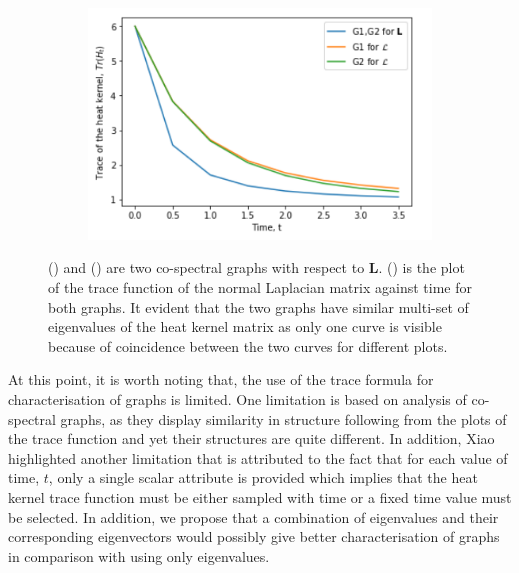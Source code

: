 \documentclass[10pt,a4paper]{article}
\theoremstyle{plain}
\theoremstyle{definition}
\begin{document}
\begin{figure}[H]
\begin{subfigure}[b]{0.30\textwidth}
        		\caption{}
        		\label{cospectralgraph2}
        	\end{subfigure}~
        	\begin{subfigure}[b]{0.35\textwidth}
        		\includegraphics[width= \textwidth]{images/trace-isospectral.png}
        		\caption{}
        		\label{cospectracegraphplot}
        	\end{subfigure}
        	\caption{() and ()  are two co-spectral graphs with respect to $\mathbf{L}$. () is the plot of the trace function of the normal Laplacian matrix against time for both graphs. It evident that the two graphs have similar multi-set of eigenvalues of the heat kernel matrix as only one curve is visible because of coincidence between the two curves for different plots. }
        	\label{TraceCospectral}
        \end{figure}
        
        At this point, it is worth noting that, the use of the trace formula for characterisation of graphs is limited. One limitation is based on analysis of co-spectral graphs, as they display similarity in structure following from the plots of the trace function and yet their structures are quite different. In addition, Xiao \citep{xiao2009graph} highlighted another limitation that is attributed to the fact that for each value of time, $t$, only a single scalar attribute is provided which implies that the heat kernel trace function must be either sampled with time or a fixed time value must be selected.  In addition, we propose that a combination of eigenvalues and their corresponding eigenvectors would possibly give better characterisation of graphs in comparison with using only eigenvalues.
        
\end{document}
